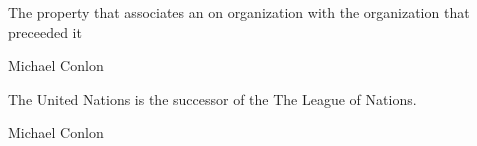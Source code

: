 \documentclass[letterpaper,10pt,english]{sphinxmanual}
\begin{document}
\begin{sphinxShadowBox}

\sphinxAtStartPar
{}
\end{sphinxShadowBox}

\begin{sphinxShadowBox}

\sphinxAtStartPar
The property that associates an on organization with the organization that preceeded it
\end{sphinxShadowBox}

\begin{sphinxShadowBox}

\sphinxAtStartPar
Michael Conlon 
\end{sphinxShadowBox}

\begin{sphinxShadowBox}

\sphinxAtStartPar
{\hyperref[\detokenize{doc-ORG_0000001::doc}]{}}
\end{sphinxShadowBox}

\begin{sphinxShadowBox}

\sphinxAtStartPar
{\hyperref[\detokenize{doc-ORG_0000001::doc}]{}}
\end{sphinxShadowBox}

\begin{sphinxShadowBox}

\sphinxAtStartPar
The United Nations is the successor of the The League of Nations.
\end{sphinxShadowBox}

\begin{sphinxShadowBox}

\sphinxAtStartPar
{}
\end{sphinxShadowBox}

\begin{sphinxShadowBox}

\sphinxAtStartPar
Michael Conlon 
\end{sphinxShadowBox}
\begin{quote}

\ignorespaces \end{quote}
\end{document}
